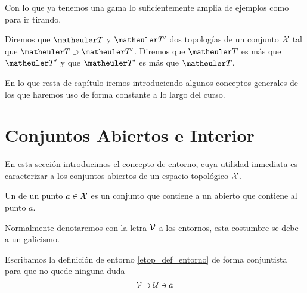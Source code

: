 \begin{exa}[Topologías]
\begin{enumerate}
		
	\end{enumerate}
	Con lo que ya tenemos una gama lo suficientemente amplia de ejemplos como para ir tirando.
\end{exa}
\begin{defi}
	Diremos que $\T$ y $\T'$ dos topologías de  un conjunto $\mathcal{X}$ tal que $\T \supset \T'$. Diremos que $\T$ es más  que $\T'$ y que $\T'$ es más  que $\T$.
\end{defi}
En lo que resta de capítulo iremos introduciendo algunos conceptos generales de los que haremos uso de forma constante a lo largo del curso.
\section{Conjuntos Abiertos e Interior}
\label{etop_entornos}
En esta sección introducimos el concepto de entorno, cuya utilidad inmediata es caracterizar a los conjuntos abiertos de un espacio topológico $\mathcal{X}$.
\begin{defi}
	\label{etop_def_entorno}
	Un  de un punto $a\in\mathcal{X}$ es un conjunto que contiene a un abierto que contiene al punto $a$.
\end{defi}
Normalmente denotaremos con la letra $\mathcal{V}$ a los entornos, esta costumbre se debe a un galicismo. %

Escribamos la definición de entorno \ref{etop_def_entorno} de forma conjuntista para que no quede ninguna duda
\begin{equation}
\label{etop_eq_entorno}
\mathcal{V}\supset\mathcal{U}\ni a
\end{equation}

